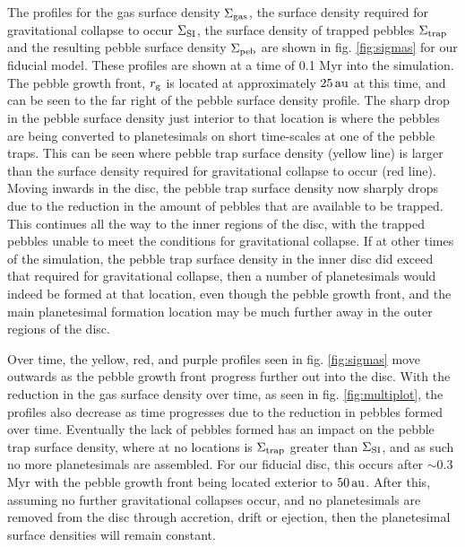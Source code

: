 \documentclass[a4paper,fleqn,usenatbib]{mnras}
\newcommand{\au}{{\, {\rm au}}}
\begin{document}
The profiles for the gas surface density $\Sigma_{\rm gas}$, the surface density required for gravitational collapse to occur $\Sigma_{\rm SI}$, the surface density of trapped pebbles $\Sigma_{\rm trap}$ and the resulting pebble surface density $\Sigma_{\rm peb}$ are shown in fig. \ref{fig:sigmas} for our fiducial model.
These profiles are shown at a time of 0.1 Myr into the simulation.
The pebble growth front, $r_{\rm g}$ is located at approximately $25 \au$ at this time, and can be seen to the far right of the pebble surface density profile.
The sharp drop in the pebble surface density just interior to that location is where the pebbles are being converted to planetesimals on short time-scales at one of the pebble traps.
This can be seen where pebble trap surface density (yellow line) is larger than the surface density required for gravitational collapse to occur (red line).
Moving inwards in the disc, the pebble trap surface density now sharply drops due to the reduction in the amount of pebbles that are available to be trapped.
This continues all the way to the inner regions of the disc, with the trapped pebbles unable to meet the conditions for gravitational collapse.
If at other times of the simulation, the pebble trap surface density in the inner disc did exceed that required for gravitational collapse, then a number of planetesimals would indeed be formed at that location, even though the pebble growth front, and the main planetesimal formation location may be much further away in the outer regions of the disc.

Over time, the yellow, red, and purple profiles seen in fig. \ref{fig:sigmas} move outwards as the pebble growth front progress further out into the disc.
With the reduction in the gas surface density over time, as seen in fig. \ref{fig:multiplot}, the profiles also decrease as time progresses due to the reduction in pebbles formed over time.
Eventually the lack of pebbles formed has an impact on the pebble trap surface density, where at no locations is $\Sigma_{\rm trap}$ greater than $\Sigma_{\rm SI}$, and as such no more planetesimals are assembled.
For our fiducial disc, this occurs after $\sim 0.3$ Myr with the pebble growth front being located exterior to $50 \au$.
After this, assuming no further gravitational collapses occur, and no planetesimals are removed from the disc through accretion, drift or ejection, then the planetesimal surface densities will remain constant.
\end{document}
